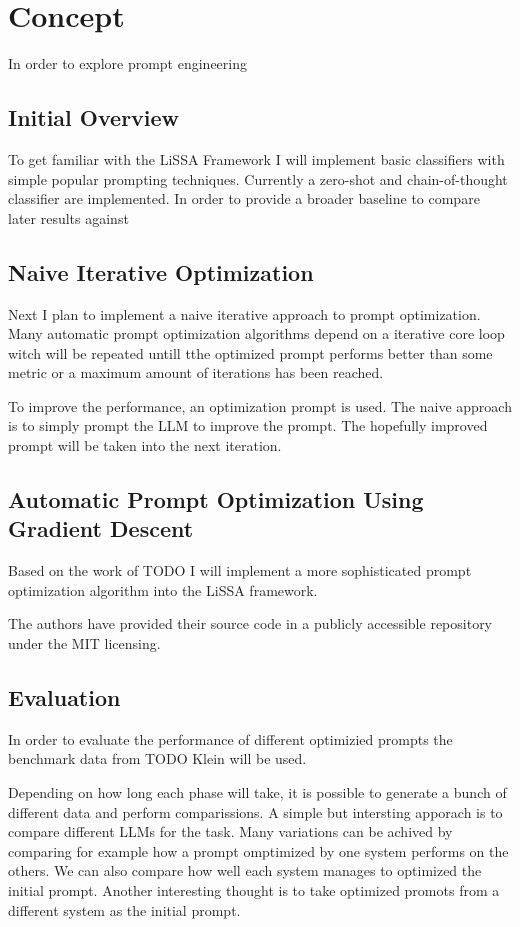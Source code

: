 \chapter{Concept}
\label{conecpt}

In order to explore prompt engineering

\section{Initial Overview}
To get familiar with the LiSSA Framework I will implement basic classifiers with simple popular prompting techniques.
Currently a zero-shot and chain-of-thought classifier are implemented. In order to provide a broader baseline to compare later results against 

\section{Naive Iterative Optimization}
Next I plan to implement a naive iterative approach to prompt optimization. Many automatic prompt optimization algorithms depend on a iterative core loop witch will be repeated untill tthe optimized prompt performs better than some metric or a maximum amount of iterations has been reached.

To improve the performance, an optimization prompt is used. The naive approach is to simply prompt the LLM to improve the prompt. The hopefully improved prompt will be taken into the next iteration.

\section{Automatic Prompt Optimization Using Gradient Descent}
Based on the work of TODO I will implement a more sophisticated prompt optimization algorithm into the LiSSA framework. 

The authors have provided their source code in a publicly accessible repository under the MIT licensing. 

\section{Evaluation}
In order to evaluate the performance of different optimizied prompts the benchmark data from TODO Klein will be used.

Depending on how long each phase will take, it is possible to generate a bunch of different data and perform comparissions.
A simple but intersting apporach is to compare different LLMs for the task. Many variations can be achived by comparing for example how a prompt omptimized by one system performs on the others. We can also compare how well each system manages to optimized the initial prompt. 
Another interesting thought is to take optimized promots from a different system as the initial prompt. 